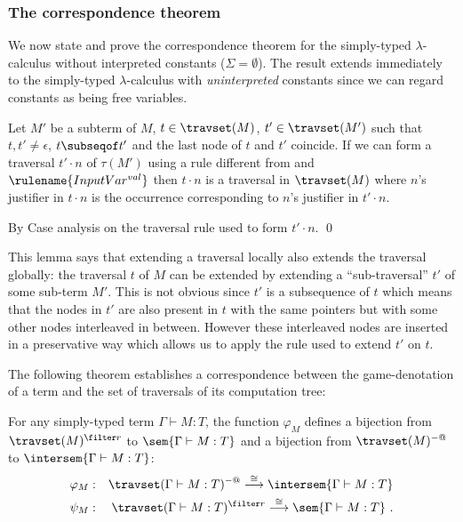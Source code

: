 \subsubsection{The correspondence theorem}
We now state and prove the correspondence theorem for the
simply-typed $\lambda$-calculus without interpreted constants
($\Sigma = \emptyset$). The result extends immediately to the
simply-typed $\lambda$-calculus with \emph{uninterpreted} constants
since we can regard constants as being free variables.

\begin{lemma}
\label{lem:local_traversal_progression}
Let $M'$ be a subterm of $M$, $t \in \travset(M)$,
$t' \in \travset(M')$ such that $t,t' \neq \epsilon$, $t\subseqof t'$
and the last node of $t$ and $t'$ coincide. 
If we can form a traversal $t' \cdot n$ of $\tau(M')$ using a rule different from  and $\rulename{InputVar^{val}}$ then 
$ t \cdot n$ is a traversal in $\travset(M)$
where $n$'s justifier in $t \cdot n$ is the occurrence corresponding
to $n$'s justifier in $t' \cdot n$.
\end{lemma}
\proof
By Case analysis on the traversal rule used to form $t'\cdot n$.
\qed

This lemma says that extending a traversal locally also extends the traversal globally: the traversal $t$ of $M$ can be extended by extending a ``sub-traversal'' $t'$ of some sub-term $M'$.
This is not obvious since $t'$ is a subsequence of $t$ which means that
the nodes in $t'$ are also present in $t$ with the same pointers but with some other nodes interleaved in between. However these interleaved nodes are inserted in a preservative way which allows us to apply the rule used to extend $t'$ on $t$.

The following theorem establishes a correspondence between the
game-denotation of a term and the set of traversals of its
computation tree:
\begin{theorem}
\label{thm:correspondence}
 For any simply-typed term $\Gamma \vdash M :T$,
the function $\varphi_M$ defines a bijection from $\travset(M)^{\filter
r}$ to $\sem{\Gamma \vdash M : T}$ and a bijection from
$\travset(M)^{-@}$ to $\intersem{\Gamma \vdash M : T}$:
\begin{eqnarray*}
 \varphi_M  &:& \travset(\Gamma \vdash M : T)^{-@} \stackrel{\cong}{\longrightarrow} \intersem{\Gamma \vdash M :T} \\
 \psi_M  &:& \travset(\Gamma \vdash M : T)^{\filter r} \stackrel{\cong}{\longrightarrow} \sem{\Gamma \vdash M :T} \ .
\end{eqnarray*}

\end{theorem}

